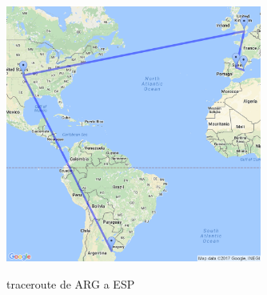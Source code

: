 \pagebreak

\begin{figure}[!h]
\centering
\caption{traceroute de ARG a ESP}
\includegraphics[width=0.75\textwidth]{modules/traceroute-EU}
 \label{fig:traceroute-EU}
\end{figure}
